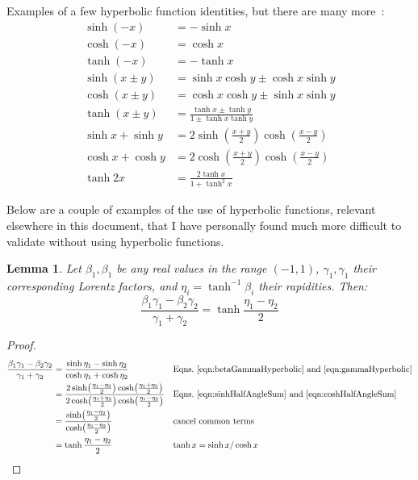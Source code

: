 \documentclass[a4paper]{article}
\theoremstyle{plain}
\newtheorem{lemma}[theorem]{Lemma}
\theoremstyle{definition}
\begin{document}
Examples of a few hyperbolic function identities, but there are many
more~\cite{WikipediaHyperbolicFunctions}:
\begin{align}
\sinh (-x) & = -\sinh x \\
\cosh (-x) & = \cosh x \\
\tanh (-x) & = - \tanh x \\
\sinh (x \pm y) & = \sinh x \cosh y \pm \cosh x \sinh y \\
\cosh (x \pm y) & = \cosh x \cosh y \pm \sinh x \sinh y \\
\tanh (x \pm y) & = \frac{\tanh x \pm \tanh y}{1 \pm \tanh x \tanh y} \\
\sinh x + \sinh y & = 2 \sinh (\frac{x+y}{2} ) \cosh (\frac{x-y}{2}) \label{eqn:sinhHalfAngleSum} \\
\cosh x + \cosh y & = 2 \cosh (\frac{x+y}{2} ) \cosh (\frac{x-y}{2}) \label{eqn:coshHalfAngleSum} \\
\tanh 2x & = \frac{2 \tanh x}{1+\tanh^2 x} \label{eqn:tanhDoubleAngle}
\end{align}

Below are a couple of examples of the use of hyperbolic functions,
relevant elsewhere in this document, that I have personally found much
more difficult to validate without using hyperbolic functions.

\begin{lemma}
\label{lem:halfRapidityDifference}
Let $\beta_1, \beta_1$ be any real values in the range $(-1,1)$,
$\gamma_1, \gamma_1$ their corresponding Lorentz factors, and $\eta_i
= \tanh^{-1} \beta_i$ their rapidities.
Then:
\begin{equation}
\frac{\beta_1 \gamma_1 - \beta_2 \gamma_2}{\gamma_1 + \gamma_2} = \tanh \frac{\eta_1-\eta_2}{2}
\end{equation}
\end{lemma}

\begin{proof}
\begin{align*}
\frac{\beta_1 \gamma_1 - \beta_2 \gamma_2}{\gamma_1 + \gamma_2}
  & = \frac{\sinh \eta_1 - \sinh \eta_2}{\cosh \eta_1 + \cosh \eta_2} & & \text{Eqns.~\eqref{eqn:betaGammaHyperbolic} and~\eqref{eqn:gammaHyperbolic}} \\
  & = \frac{2 \sinh ( \frac{\eta_1-\eta_2}{2} ) \cosh ( \frac{\eta_1+\eta_2}{2} ) }{2 \cosh ( \frac{\eta_1+\eta_2}{2} ) \cosh ( \frac{\eta_1-\eta_2}{2} ) } & & \text{Eqns.~\eqref{eqn:sinhHalfAngleSum} and~\eqref{eqn:coshHalfAngleSum}} \\
  & = \frac{\sinh ( \frac{\eta_1-\eta_2}{2} ) }{\cosh ( \frac{\eta_1-\eta_2}{2} ) } & & \text{cancel common terms} \\
  & = \tanh \frac{\eta_1-\eta_2}{2} & & \text{$\tanh x = \sinh x / \cosh x$}
\end{align*}
\end{proof}
\end{document}
